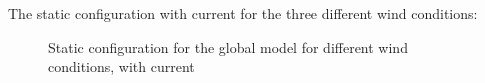 The static configuration with current for the three different wind conditions: 
\begin{figure}[H]
\hfill
{}\hfill
  \hfill
\caption{Static configuration for the global model for different wind conditions, with current}
\label{fig:statconc}
\end{figure}

